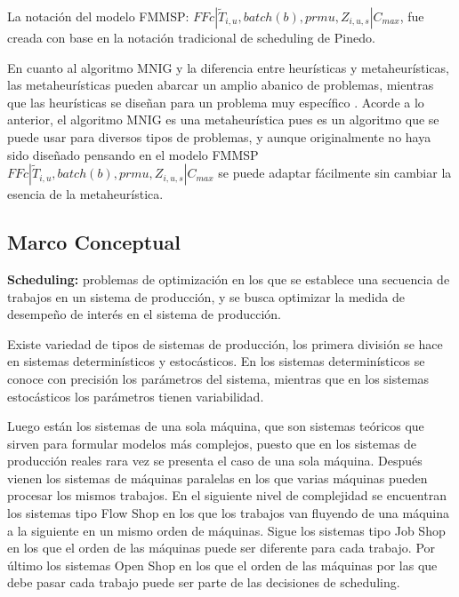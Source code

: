 \documentclass{article}
\def\notac_modelo{$FFc | \tilde{T}_{i, u}, batch(b), prmu, Z_{i, u, s} | C_{max}$}
\begin{document}
\vspace{\baselineskip}
La notación del modelo FMMSP: \notac_modelo, fue creada con base en la notación tradicional de scheduling de Pinedo. \autocite{schedPinedo}

\vspace{\baselineskip}
En cuanto al algoritmo MNIG y la diferencia entre heurísticas y metaheurísticas, las metaheurísticas pueden abarcar un amplio abanico de problemas, mientras que las heurísticas se diseñan para un problema muy específico \autocite{metaTalbi}. Acorde a lo anterior, el algoritmo MNIG es una metaheurística pues es un algoritmo que se puede usar para diversos tipos de problemas, y aunque originalmente no haya sido diseñado pensando en el modelo FMMSP \linebreak \notac_modelo se puede adaptar fácilmente sin cambiar la esencia de la metaheurística.

\subsection{Marco Conceptual}

\indent\indent
\textbf{Scheduling:} problemas de optimización en los que se establece una secuencia de trabajos en un sistema de producción, y se busca optimizar la medida de desempeño de interés en el sistema de producción.

\vspace{\baselineskip}
Existe variedad de tipos de sistemas de producción, los primera división se hace en sistemas determinísticos y estocásticos. En los sistemas determinísticos se conoce con precisión los parámetros del sistema, mientras que en los sistemas estocásticos los parámetros tienen variabilidad. \autocite{schedPinedo}

\vspace{\baselineskip}
Luego están los sistemas de una sola máquina, que son sistemas teóricos que sirven para formular modelos más complejos, puesto que en los sistemas de producción reales rara vez se presenta el caso de una sola máquina. Después vienen los sistemas de máquinas paralelas en los que varias máquinas pueden procesar los mismos trabajos. En el siguiente nivel de complejidad se encuentran los sistemas tipo Flow Shop en los que los trabajos van fluyendo de una máquina a la siguiente en un mismo orden de máquinas. Sigue los sistemas tipo Job Shop en los que el orden de las máquinas puede ser diferente para cada trabajo. Por último los sistemas Open Shop en los que el orden de las máquinas por las que debe pasar cada trabajo puede ser parte de las decisiones de scheduling. \autocite{schedPinedo}
\end{document}
